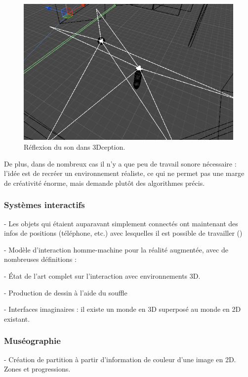 \documentclass[french,12pt]{article}
\begin{document}
\begin{figure}[h]
    \centering
    \includegraphics[scale=0.5]{images/3Dception.png}
    \caption{Réflexion du son dans 3Dception.}
    \label{fig.3Dception}
\end{figure}

De plus, dans de nombreux cas il n'y a que peu de travail sonore nécessaire : l'idée est de recréer un environnement réaliste, ce qui ne permet pas une marge de créativité énorme, mais demande plutôt des algorithmes précis.
\subsubsection{Systèmes interactifs}

- Les objets qui étaient auparavant simplement connectés ont maintenant des infos de positions (téléphone, etc.) avec lesquelles il est possible de travailler (\cite{beal_spacetime_2015})

- Modèle d'interaction homme-machine pour la réalité augmentée, avec de nombreuses définitions : \cite{chalon_realite_2004}

- État de l'art complet sur l'interaction avec environnements 3D.
\cite{jankowski_advances_2015}

- Production de dessin à l'aide du souffle
\cite{shen_blowbrush:_2014}

- Interfaces imaginaires : il existe un monde en 3D superposé au monde en 2D existant.
\cite{gustafson_imaginary_2010}

\subsubsection{Muséographie}
- Création de partition à partir d'information de couleur d'une image en 2D. Zones et progressions.
\cite{adhitya_composing_2012}
\end{document}
